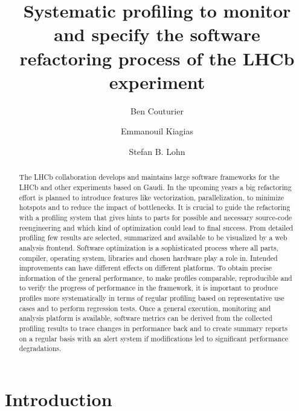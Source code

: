 \documentclass[a4paper]{jpconf}
\begin{document}
\title{Systematic profiling to monitor and specify the software refactoring process of the LHCb experiment}

\author{Ben Couturier}
\address{CERN, CH-1211 Geneva 23, Switzerland}

\author{Emmanouil Kiagias}
\address{CERN, CH-1211 Geneva 23, Switzerland}

\author{Stefan B. Lohn}
\address{CERN, CH-1211 Geneva 23, Switzerland}

\begin{abstract}
The LHCb collaboration develops and maintains large software frameworks for the LHCb and other experiments based on Gaudi. In the upcoming years a big refactoring effort is planned to introduce features like vectorization, parallelization, to minimize hotspots and to reduce the impact of bottlenecks. It is crucial to guide the refactoring with a profiling system that gives hints to parts for possible and necessary source-code reengineering and which kind of optimization could lead to final success. From detailed profiling few results are selected, summarized and available to be visualized by a web analysis frontend.
\newline
Software optimization is a sophisticated process where all parts, compiler, operating system, libraries and chosen hardware play a role in. Intended improvements can have different effects on different platforms. To obtain precise information of the general performance, to make profiles comparable, reproducible and to verify the progress of performance in the framework, it is important to produce profiles more systematically in terms of regular profiling based on representative use cases and to perform regression tests. Once a general execution, monitoring and analysis platform is available, software metrics can be derived from the collected profiling results to trace changes in performance back and to create summary reports on a regular basis with an alert system if modifications led to significant performance degradations.
\end{abstract}

\newpage

\section{Introduction}
\label{sec:introduction}
\end{document}
